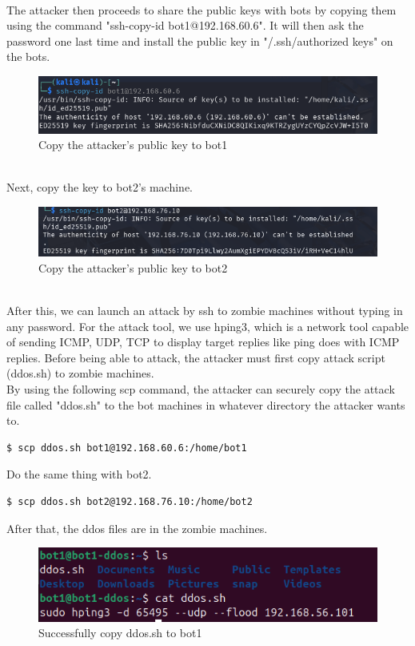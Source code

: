 \\
The attacker then proceeds to share the public keys with bots by copying them using the command "ssh-copy-id bot1@192.168.60.6". It will then ask the password one last time and install the public key in "/.ssh/authorized \textunderscore keys" on the bots.
\begin{figure}[!htb]
    \centering
    \includegraphics[width=0.8\linewidth]{thesis/ssh-copy-id-1.png}
    \caption{Copy the attacker's public key to bot1}
    \label{fig:enter-label}
\end{figure}
\\
Next, copy the key to bot2's machine.
\begin{figure}[!htb]
    \centering
    \includegraphics[width=0.8\linewidth]{thesis/ssh-copy-id-2.png}
    \caption{Copy the attacker's public key to bot2}
    \label{fig:enter-label}
\end{figure}
\\ After this, we can launch an attack by ssh to zombie machines without typing in any password. For the attack tool, we use hping3, which is a network tool capable of sending ICMP, UDP, TCP to display target replies like ping does with ICMP replies. Before being able to attack, the attacker must first copy attack script (ddos.sh) to zombie machines.
\\
By using the following scp command, the attacker can securely copy the attack file called "ddos.sh" to the bot machines in whatever directory the attacker wants to.
\begin{lstlisting}[language=bash,caption={Command to copy ddos.sh file to bot1}]
$ scp ddos.sh bot1@192.168.60.6:/home/bot1
\end{lstlisting}
Do the same thing with bot2.
\begin{lstlisting}[language=bash,caption={Command to copy ddos.sh file to bot2}]
$ scp ddos.sh bot2@192.168.76.10:/home/bot2
\end{lstlisting}
After that, the ddos files are in the zombie machines.
\begin{figure}[htb]
    \centering
    \includegraphics[width=0.8\linewidth]{thesis/bot1AfterCopy.png}
    \caption{Successfully copy ddos.sh to bot1}
    \label{fig:enter-label}
\end{figure}
